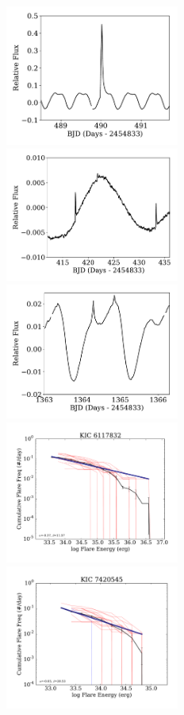\documentclass[preprint2]{aastex62}
\begin{document}
\begin{figure}[!t]
\centering
\includegraphics[width=2.25in]{fig1a}
\includegraphics[width=2.25in]{fig1b}
\includegraphics[width=2.25in]{fig1c}\\
\includegraphics[width=2.25in]{fig1d}
\includegraphics[width=2.25in]{fig1e}

\end{figure}
\end{document}
